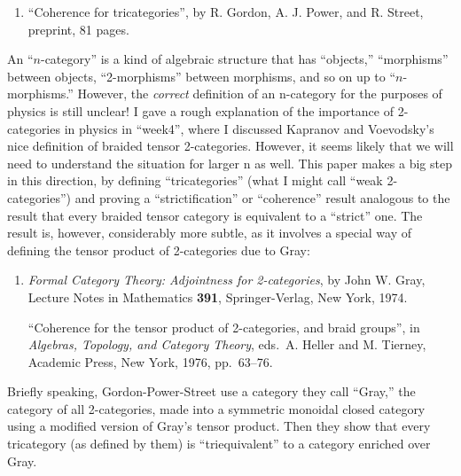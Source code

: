 \documentclass{article}
\def\tightlist{}
\renewcommand{\texttt}[1]{%
  \begingroup
  \ttfamily
  \begingroup\lccode`~=`/\lowercase{\endgroup\def~}{/\discretionary{}{}{}}%
  \begingroup\lccode`~=`[\lowercase{\endgroup\def~}{[\discretionary{}{}{}}%
  \begingroup\lccode`~=`.\lowercase{\endgroup\def~}{.\discretionary{}{}{}}%
  \catcode`/=\active\catcode`[=\active\catcode`.=\active
  \scantokens{#1\noexpand}%
  \endgroup
}
\begin{document}
\begin{enumerate}
\def\labelenumi{\arabic{enumi})}
\setcounter{enumi}{1}
\tightlist
\item
  ``Coherence for tricategories'', by R. Gordon, A. J. Power, and R.
  Street, preprint, 81 pages.
\end{enumerate}

An ``\(n\)-category'' is a kind of algebraic structure that has
``objects,'' ``morphisms'' between objects, ``2-morphisms'' between
morphisms, and so on up to ``\(n\)-morphisms.'' However, the
\emph{correct} definition of an n-category for the purposes of physics
is still unclear! I gave a rough explanation of the importance of
2-categories in physics in ``week4'', where I discussed Kapranov and
Voevodsky's nice definition of braided tensor 2-categories. However, it
seems likely that we will need to understand the situation for larger n
as well. This paper makes a big step in this direction, by defining
``tricategories'' (what I might call ``weak 2-categories'') and proving
a ``strictification'' or ``coherence'' result analogous to the result
that every braided tensor category is equivalent to a ``strict'' one.
The result is, however, considerably more subtle, as it involves a
special way of defining the tensor product of 2-categories due to Gray:

\begin{enumerate}
\def\labelenumi{\arabic{enumi})}
\setcounter{enumi}{2}
\item
  \emph{Formal Category Theory: Adjointness for 2-categories}, by John
  W. Gray, Lecture Notes in Mathematics \textbf{391}, Springer-Verlag,
  New York, 1974.

  ``Coherence for the tensor product of 2-categories, and braid
  groups'', in \emph{Algebras, Topology, and Category Theory}, eds.~A.
  Heller and M. Tierney, Academic Press, New York, 1976, pp.~63--76.
\end{enumerate}

Briefly speaking, Gordon-Power-Street use a category they call ``Gray,''
the category of all 2-categories, made into a symmetric monoidal closed
category using a modified version of Gray's tensor product. Then they
show that every tricategory (as defined by them) is ``triequivalent'' to
a category enriched over Gray.

\end{document}
